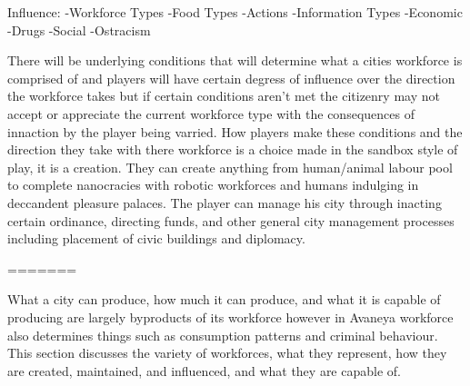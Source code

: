 Influence:
-Workforce Types
-Food Types
-Actions
-Information Types
-Economic 
-Drugs
-Social
-Ostracism



%
%
%
%
%
%
%









 



There will be underlying conditions that will determine what a cities workforce is comprised of and players will have certain degress of influence over the direction the workforce takes but if certain conditions aren't met the citizenry may not accept or appreciate the current workforce type with the consequences of innaction by the player being varried. How players make these conditions and the direction they take with there workforce is a choice made in the sandbox style of play, it is a creation. They can create anything from human/animal labour pool to complete nanocracies with robotic workforces and humans indulging in deccandent pleasure palaces. The player can manage his city through inacting certain ordinance, directing funds, and other general city management processes including placement of civic buildings and diplomacy. 






=======


What a city can produce, how much it can produce, and what it is capable of producing are largely byproducts of its workforce however in Avaneya workforce also determines things such as consumption patterns and criminal behaviour. This section discusses the variety of workforces, what they represent, how they are created, maintained, and influenced, and what they are capable of. 

